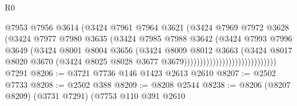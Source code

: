 \begin{lexlean}{R0}
\begin{coremodule}
                                            @7953
                                            @7956
                                            @3614
                                            (@3424
                                              @7961
                                              @7964
                                              @3621
                                              (@3424
                                                @7969
                                                @7972
                                                @3628
                                                (@3424
                                                  @7977
                                                  @7980
                                                  @3635
                                                  (@3424
                                                    @7985
                                                    @7988
                                                    @3642
                                                    (@3424
                                                      @7993
                                                      @7996
                                                      @3649
                                                      (@3424
                                                        @8001
                                                        @8004
                                                        @3656
                                                        (@3424
                                                          @8009
                                                          @8012
                                                          @3663
                                                          (@3424
                                                            @8017
                                                            @8020
                                                            @3670
                                                            (@3424
                                                              @8025
                                                              @8028
                                                              @3677
                                                              @3679)))))))))))))))))))))))))))))
    @7291
@8206 := @3721 @7736 @146 @1423 @2613 @2610
@8207 := @2502 @7733
@8208 := @2502 @388
@8209 := @8208 @2544
@8238 := @8206
    (@8207 @8209)
    (@3731 @7291)
    (@7753
      @110
      @391
      @2610

\end{coremodule}
\end{lexlean}
